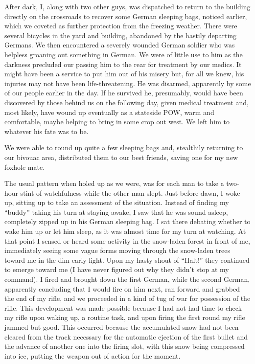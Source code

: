 \documentclass[../m3y]{subfiles}
\begin{document}
After dark, I, along with two other guys, was dispatched to return to the building directly on the crossroads to recover some German sleeping bags, noticed earlier, which we coveted as further protection from the freezing weather. There were several bicycles in the yard and building, abandoned by the hastily departing Germans. We then encountered a severely wounded German soldier who was helpless groaning out something in German. We were of little use to him as the darkness precluded our passing him to the rear for treatment by our medics. It might have been a service to put him out of his misery but, for all we knew, his injuries may not have been life-threatening. He was disarmed, apparently by some of our people earlier in the day. If he survived he, presumably, would have been discovered by those behind us on the following day, given medical treatment and, most likely, have wound up eventually as a stateside POW, warm and comfortable, maybe helping to bring in some crop out west. We left him to whatever his fate was to be.

We were able to round up quite a few sleeping bags and, stealthily returning to our bivouac area, distributed them to our best friends, saving one for my new foxhole mate.

The usual pattern when holed up as we were, was for each man to take a two-hour stint of watchfulness while the other man slept. Just before dawn, I woke up, sitting up to take an  assessment of the situation. Instead of finding my ``buddy'' taking his turn at staying awake, I saw that he was sound asleep, completely zipped up in his German sleeping bag. I sat there debating whether to wake him up or let him sleep, as it was almost time for my turn at watching. At that point I sensed or heard some activity in the snow-laden forest in front of me, immediately seeing some vague forms moving through the snow-laden trees toward me in the dim early light. Upon my hasty shout of ``Halt!'' they continued to emerge toward me (I have never figured out why they didn't stop at my command). I fired and brought down the first German, while the second German, apparently concluding that I would fire on him next, ran forward and grabbed the end of my rifle, and we proceeded in a kind of tug of war for possession of the rifle. This development was made possible because I had not had time to check my rifle upon waking up, a routine task, and upon firing the first round my rifle jammed but good. This occurred because the accumulated snow had not been cleared from the track necessary for the automatic ejection of the first bullet and the advance of another one into the firing slot, with this snow being compressed into ice, putting the weapon out of action for the moment.
\end{document}
